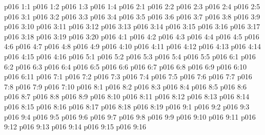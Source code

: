 \vs p016 1:1 
\vs p016 1:2 
\vs p016 1:3 
\vs p016 1:4 
\vs p016 2:1 
\vs p016 2:2 
\vs p016 2:3 \pc 
\vs p016 2:4 \pc 
\vs p016 2:5 
\vs p016 3:1 
\vs p016 3:2 
\vs p016 3:3 
\vs p016 3:4 \pc 
\vs p016 3:5 
\vs p016 3:6 \pc 
\vs p016 3:7 
\vs p016 3:8 \pc 
\vs p016 3:9 
\vs p016 3:10 \pc 
\vs p016 3:11 
\vs p016 3:12 \pc 
\vs p016 3:13 
\vs p016 3:14 \pc 
\vs p016 3:15 
\vs p016 3:16 
\vs p016 3:17 
\vs p016 3:18 
\vs p016 3:19 
\vs p016 3:20 
\vs p016 4:1 
\vs p016 4:2 
\vs p016 4:3 
\vs p016 4:4 
\vs p016 4:5 
\vs p016 4:6 
\vs p016 4:7 
\vs p016 4:8 \pc 
\vs p016 4:9 
\vs p016 4:10 
\vs p016 4:11 
\vs p016 4:12 
\vs p016 4:13 
\vs p016 4:14 
\vs p016 4:15 
\vs p016 4:16 \pc 
{}
\vs p016 5:1 
\vs p016 5:2 
\vs p016 5:3 
\vs p016 5:4 
\vs p016 5:5 
\vs p016 6:1 
\vs p016 6:2 
\vs p016 6:3 
\vs p016 6:4 \pc 
\vs p016 6:5 
\vs p016 6:6 
\vs p016 6:7 
\vs p016 6:8 
\vs p016 6:9 \pc 
\vs p016 6:10 \pc 
\vs p016 6:11 
\vs p016 7:1 
\vs p016 7:2 
\vs p016 7:3 
\vs p016 7:4 
\vs p016 7:5 
\vs p016 7:6 \pc 
\vs p016 7:7 
\vs p016 7:8 \pc 
\vs p016 7:9 \pc 
\vs p016 7:10 
\vs p016 8:1 
\vs p016 8:2 
\vs p016 8:3 
\vs p016 8:4 
\vs p016 8:5 \pc 
\vs p016 8:6 
\vs p016 8:7 \pc 
\vs p016 8:8 
\vs p016 8:9 
\vs p016 8:10 
\vs p016 8:11 
\vs p016 8:12 
\vs p016 8:13 
\vs p016 8:14 
\vs p016 8:15 \pc 
\vs p016 8:16 
\vs p016 8:17 
\vs p016 8:18 
\vs p016 8:19 \pc 
{}
\vs p016 9:1 
\vs p016 9:2 
\vs p016 9:3 
\vs p016 9:4 \pc 
\vs p016 9:5 
\vs p016 9:6 
\vs p016 9:7 \pc 
\vs p016 9:8 
\vs p016 9:9 
\vs p016 9:10 
\vs p016 9:11 
\vs p016 9:12 
\vs p016 9:13 
\vs p016 9:14 \pc 
\vs p016 9:15 
\vsetoff
\vs p016 9:16 
\quizlink
